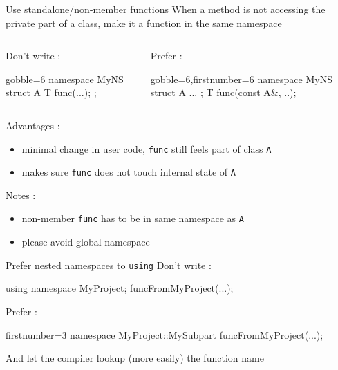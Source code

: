 \begin{frame}[fragile]
  \begin{block}{Use standalone/non-member functions}
    When a method is not accessing the private part of a class, make it a function in the same namespace
    \vspace{-1mm}
    \begin{columns}[T]
      \begin{column}{.35\textwidth}
        Don't write :
        \vspace{-1mm}
        \begin{cppcode*}{gobble=6}
          namespace MyNS {
            struct A {
              T func(...);
            };
          }
        \end{cppcode*}
      \end{column}
      \begin{column}{.35\textwidth}
        Prefer :
        \vspace{-1mm}
        \begin{cppcode*}{gobble=6,firstnumber=6}
          namespace MyNS {
            struct A { ... };
            T func(const A&, ..);
          }
        \end{cppcode*}
      \end{column}
    \end{columns}
    \vspace{.2cm}
    Advantages :
    \begin{itemize}
    \item minimal change in user code, \texttt{func} still feels part of class \texttt{A}
    \item makes sure \texttt{func} does not touch internal state of \texttt{A}
    \end{itemize}
    Notes :
    \begin{itemize}
    \item non-member \texttt{func} has to be in same namespace as \texttt{A}
    \item please avoid global namespace
    \end{itemize}
  \end{block}
\end{frame}

\begin{frame}[fragile]
  \begin{block}{Prefer nested namespaces to \texttt{using}}
    Don't write :
    \begin{cppcode}
      using namespace MyProject;
      funcFromMyProject(...);
    \end{cppcode}
    Prefer :
    \begin{cppcode*}{firstnumber=3}
      namespace MyProject::MySubpart {
        funcFromMyProject(...);
      }
    \end{cppcode*}
    And let the compiler lookup (more easily) the function name
  \end{block}
\end{frame}

